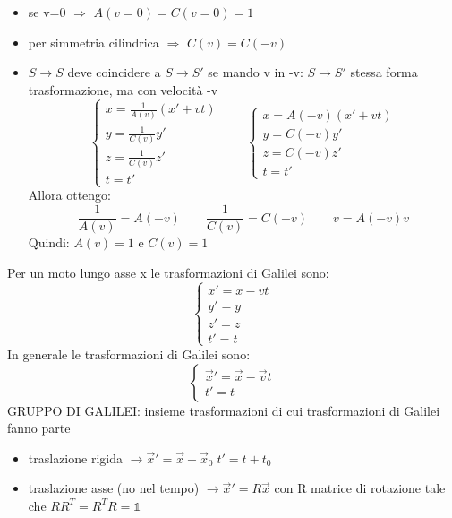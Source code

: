 \documentclass[a4paper,11pt]{report}
\theoremstyle{remark}
\theoremstyle{definition}
\begin{document}
\begin{itemize}
    \item se v=0 $\Rightarrow$ $A(v=0)=C(v=0)=1$
    \item per simmetria cilindrica $\Rightarrow$ $C(v)=C(-v)$
    \item $S \rightarrow S$ deve coincidere a $S \rightarrow S'$ se mando v in -v: $S \rightarrow S'$ stessa forma trasformazione, ma con velocità -v \newline
    \begin{equation*}\begin{cases}
        x = \frac{1}{A(v)}(x'+vt) \\
        y = \frac{1}{C(v)}y' \\
        z = \frac{1}{C(v)}z' \\
        t = t'
    \end{cases} \qquad 
    \begin{cases}
        x = A(-v)(x' +vt) \\
        y = C(-v)y' \\
        z = C(-v)z' \\
        t = t'
    \end{cases}
\end{equation*}
Allora ottengo:
\begin{equation*}
    \frac{1}{A(v)}= A(-v) \qquad \frac{1}{C(v)}= C(-v) \qquad v = A(-v)v
\end{equation*}
Quindi: $A(v)=1 $ e $C(v)=1$
\end{itemize}
Per un moto lungo asse x le trasformazioni di Galilei sono:
\begin{equation*}
    \begin{cases}
        x' = x -vt \\
        y' = y \\
        z' = z \\
        t' = t
    \end{cases}
\end{equation*}
In generale le trasformazioni di Galilei sono:
\begin{equation*}
    \begin{cases}
        \vec{x}' = \vec{x} - \vec{v}t \\
        t'=t
    \end{cases}
\end{equation*}
GRUPPO DI GALILEI: insieme trasformazioni di cui trasformazioni di Galilei fanno parte
\begin{itemize}
    \item traslazione rigida $\rightarrow \vec{x}' = \vec{x} + \vec{x}_0 \; t'=t + t_0$
    \item traslazione asse (no nel tempo) $\rightarrow \vec{x}' = R\vec{x}$ con R matrice di rotazione tale che $RR^T = R^TR = \mathbb{1}$
\end{itemize}
\end{document}
